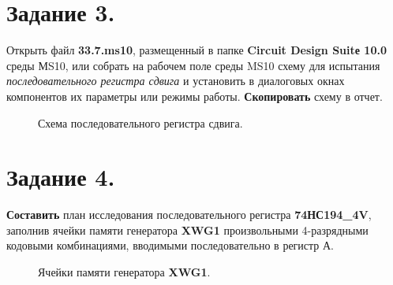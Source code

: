 \documentclass[spec, och, otchet, hidelinks]{SCWorks}
\begin{document}
\newpage

\section*{Задание 3.}

Открыть файл \textbf{33.7.ms10}, размещенный в папке \textbf{Circuit Design Suitе 10.0} среды МS10, или собрать на рабочем поле среды MS10 схему для 
испытания \textit{последовательного регистра сдвига} и установить в диалоговых окнах компонентов их параметры или режимы работы. \textbf{Скопировать} 
схему в отчет.

\begin{figure}[h]
	\caption{Схема последовательного регистра сдвига.}
\end{figure}

\newpage

\section*{Задание 4.}

\textbf{Составить} план исследования последовательного регистра \textbf{74НС194\_4V}, заполнив ячейки памяти генератора \textbf{XWG1} произвольными 4-разрядными кодовыми комбинациями, вводимыми последовательно в регистр А.

\begin{figure}[h]
	\caption{Ячейки памяти генератора \textbf{XWG1}.}
\end{figure}
\end{document}
